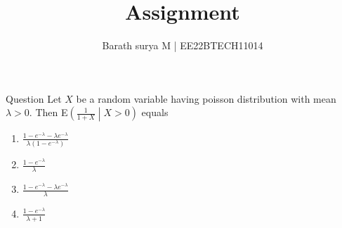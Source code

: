 \documentclass[journal,11pt,twocolumn]{IEEEtran}
\title{Assignment}
\author{Barath surya M | EE22BTECH11014}
\DeclareMathOperator*{\Res}{Res}
\providecommand{\pr}[1]{\ensuremath{\Pr\left(#1\right)}}
\providecommand{\qfunc}[1]{\ensuremath{Q\left(#1\right)}}
\providecommand{\sbrak}[1]{\ensuremath{{}\left[#1\right]}}
\providecommand{\lsbrak}[1]{\ensuremath{{}\left[#1\right.}}
\providecommand{\rsbrak}[1]{\ensuremath{{}\left.#1\right]}}
\providecommand{\brak}[1]{\ensuremath{\left(#1\right)}}
\providecommand{\lbrak}[1]{\ensuremath{\left(#1\right.}}
\providecommand{\rbrak}[1]{\ensuremath{\left.#1\right)}}
\providecommand{\cbrak}[1]{\ensuremath{\left\{#1\right\}}}
\providecommand{\lcbrak}[1]{\ensuremath{\left\{#1\right.}}
\providecommand{\rcbrak}[1]{\ensuremath{\left.#1\right\}}}
\providecommand{\abs}[1]{\left\vert#1\right\vert}
\providecommand{\res}[1]{\Res\displaylimits_{#1}}
\providecommand{\norm}[1]{\left\lVert#1\right\rVert}
\providecommand{\mtx}[1]{\mathbf{#1}}
\providecommand{\mean}[1]{E\left[ #1 \right]}
\providecommand{\cond}[2]{#1\middle|#2}
\providecommand{\fourier}{\overset{\mathcal{F}}{ \rightleftharpoons}}
\providecommand{\dec}[2]{\ensuremath{\overset{#1}{\underset{#2}{\gtrless}}}}
\providecommand{\pr}[1]{\ensuremath{\Pr\left(#1\right)}}
\providecommand{\qfunc}[1]{\ensuremath{Q\left(#1\right)}}
\providecommand{\qfunc}[1]{\ensuremath{Q\left(#1\right)}}
\begin{document}
\newtheorem{theorem}{Theorem}[section]
\newtheorem{problem}{Problem}
\newtheorem{proposition}{Proposition}[section]
\newtheorem{lemma}{Lemma}[section]
\newtheorem{corollary}[theorem]{Corollary}
\newtheorem{example}{Example}[section]
\newtheorem{definition}[problem]{Definition}
\newcommand{\BEQA}{\begin{eqnarray}}
\newcommand{\EEQA}{\end{eqnarray}}
\newcommand{\define}{\stackrel{\triangle}{=}}

\providecommand{\mbf}{\mathbf}
\providecommand{\pr}[1]{\ensuremath{\Pr\left(#1\right)}}
\providecommand{\qfunc}[1]{\ensuremath{Q\left(#1\right)}}
\providecommand{\sbrak}[1]{\ensuremath{{}\left[#1\right]}}
\providecommand{\lsbrak}[1]{\ensuremath{{}\left[#1\right.}}
\providecommand{\rsbrak}[1]{\ensuremath{{}\left.#1\right]}}
\providecommand{\brak}[1]{\ensuremath{\left(#1\right)}}
\providecommand{\lbrak}[1]{\ensuremath{\left(#1\right.}}
\providecommand{\rbrak}[1]{\ensuremath{\left.#1\right)}}
\providecommand{\cbrak}[1]{\ensuremath{\left\{#1\right\}}}
\providecommand{\lcbrak}[1]{\ensuremath{\left\{#1\right.}}
\providecommand{\rcbrak}[1]{\ensuremath{\left.#1\right\}}}
\theoremstyle{remark}
\newtheorem{rem}{Remark}
\providecommand{\abs}[1]{\left\vert#1\right\vert}
\providecommand{\res}[1]{\Res\displaylimits_{#1}} 
\providecommand{\norm}[1]{\left\lVert#1\right\rVert}
\providecommand{\mtx}[1]{\mathbf{#1}}
\providecommand{\mean}[1]{E\left[ #1 \right]}
\providecommand{\fourier}{\overset{\mathcal{F}}{ \rightleftharpoons}}
\providecommand{\system}[1]{\overset{\mathcal{#1}}{ \longleftrightarrow}}
\providecommand{\dec}[2]{\ensuremath{\overset{#1}{\underset{#2}{\gtrless}}}}
\let\vec\mathbf
\def\putbox#1#2#3{\makebox[0in][l]{\makebox[#1][l]{}\raisebox{\baselineskip}[0in][0in]{\raisebox{#2}[0in][0in]{#3}}}}
     \def\rightbox#1{\makebox[0in][r]{#1}}
     \def\centbox#1{\makebox[0in]{#1}}
     \def\topbox#1{\raisebox{-\baselineskip}[0in][0in]{#1}}
     \def\midbox#1{\raisebox{-0.5\baselineskip}[0in][0in]{#1}}
\maketitle
Question Let $X$ be a random variable having poisson distribution with mean $\lambda>0$. Then E\brak{\cond{\frac{1}{1+X}}{X>0}} equals
\begin{enumerate}
	\item $\frac{1-e^{-\lambda}-\lambda e^{-\lambda}}{\lambda\brak{1-e^{-\lambda}}}$
	\item $\frac{1-e^{-\lambda}}{\lambda}$
	\item $\frac{1-e^{-\lambda}-\lambda e^{-\lambda}}{\lambda}$
	\item $\frac{1-e^{-\lambda}}{\lambda +1}$
\end{enumerate}
\end{document}
